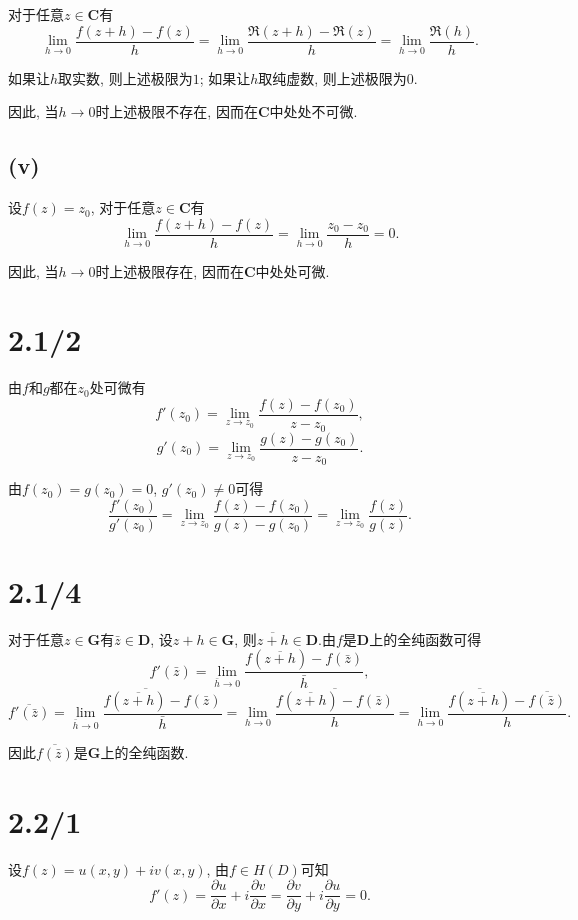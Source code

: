 \documentclass[11pt,a4paper]{article}
\begin{document}
对于任意$z\in\mathbf{C}$有
$$\lim_{h\to0}\frac{f(z+h)-f(z)}{h}=\lim_{h\to0}\frac{\Re(z+h)-\Re(z)}{h}=\lim_{h\to0}\frac{\Re(h)}{h}.$$

如果让$h$取实数, 则上述极限为$1$; 如果让$h$取纯虚数, 则上述极限为$0$.

因此, 当$h\to0$时上述极限不存在, 因而在$\mathbf{C}$中处处不可微.

\subsection*{(v)}

设$f(z)=z_0$, 对于任意$z\in\mathbf{C}$有
$$\lim_{h\to0}\frac{f(z+h)-f(z)}{h}=\lim_{h\to0}\frac{z_0-z_0}{h}=0.$$

因此, 当$h\to0$时上述极限存在, 因而在$\mathbf{C}$中处处可微.

\section{2.1/2}

由$f$和$g$都在$z_0$处可微有
$$f'(z_0)=\lim_{z\to z_0}\frac{f(z)-f(z_0)}{z-z_0},$$
$$g'(z_0)=\lim_{z\to z_0}\frac{g(z)-g(z_0)}{z-z_0}.$$

由$f(z_0)=g(z_0)=0$, $g'(z_0)\neq 0$可得
$$\frac{f'(z_0)}{g'(z_0)}=\lim_{z\to z_0}\frac{f(z)-f(z_0)}{g(z)-g(z_0)}=\lim_{z\to z_0}\frac{f(z)}{g(z)}.$$

\section{2.1/4}

对于任意$z\in\mathbf{G}$有$\bar{z}\in\mathbf{D}$, 设$z+h\in\mathbf{G}$, 则$\overline{z+h}\in\mathbf{D}$.由$f$是$\mathbf{D}$上的全纯函数可得
$$f'(\bar{z})=\lim_{\bar{h}\to0}\frac{f({\overline{z+h}})-f(\bar{z})}{\bar{h}},$$
$$\overline{f'(\bar{z})}=\overline{\lim_{\bar{h}\to0}\frac{f({\overline{z+h}})-f(\bar{z})}{\bar{h}}}=\lim_{h\to0}\frac{\overline{f(\overline{z+h})-f(\bar{z})}}{h}=\lim_{h\to0}\frac{\overline{f({\overline{z+h}})}-\overline{f(\bar{z})}}{h}.$$

因此$\overline{f(\bar{z})}$是$\mathbf{G}$上的全纯函数.

\section{2.2/1}

设$f(z)=u(x,y)+iv(x,y)$, 由$f\in H(D)$可知
$$f'(z)=\frac{\partial u}{\partial x}+i\frac{\partial v}{\partial x}=\frac{\partial v}{\partial y}+i\frac{\partial u}{\partial y}=0.$$
\end{document}

